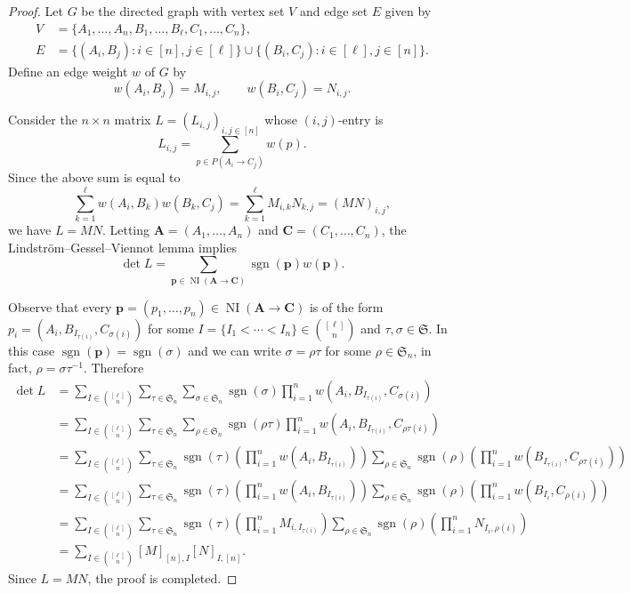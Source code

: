 \documentclass[oneside]{book}
\numberwithin{equation}{section}
\theoremstyle{definition}
\newcommand\NI{\operatorname{NI}}
\newcommand\sgn{\operatorname{sgn}}
\newcommand\sym{\mathfrak{S}}
\renewcommand\vec[1]{\mathbf{#1}}
\begin{document}
\begin{proof}
Let \( G \) be the directed graph with vertex set \( V \)
and edge set \( E \) given by
\begin{align*}
  V &= \{A_1,\dots,A_n, B_1,\dots,B_\ell, C_1,\dots,C_n\}, \\
  E &= \{(A_i,B_j): i\in [n], j\in [\ell]\} \cup
      \{(B_i,C_j): i\in [\ell], j\in [n]\}.
\end{align*}
Define an edge weight \( w \) of \( G \) by
\[
  w(A_i,B_j) = M_{i,j}, \qquad w(B_i,C_j) = N_{i,j}.
\]

Consider the \( n\times n \) matrix \( L=(L_{i,j})_{i,j\in[n]} \)
whose \( (i,j) \)-entry is
\[
  L_{i,j} = \sum_{p\in P(A_i\to C_j)} w(p).
\]
Since the above sum is equal to
\[
    \sum_{k=1}^{\ell} w(A_i,B_k) w(B_k,C_j)
  = \sum_{k=1}^{\ell} M_{i,k} N_{k,j} = (MN)_{i,j},
\]
we have \( L = MN \). Letting \( \vec A = (A_1,\dots,A_n) \) and
\( \vec C = (C_1,\dots,C_n) \), the Lindstr\"om--Gessel--Viennot lemma
implies
\[
  \det L = \sum_{\vec p\in \NI(\vec A \to \vec C)} 
  \sgn(\vec p) w(\vec p).
\]

Observe that every
\( \vec p = (p_1,\dots,p_{n})\in \NI(\vec A \to \vec C) \) is of the
form \( p_i = (A_i, B_{I_{\tau(i)}}, C_{\sigma(i)}) \) for some
\( I = \{I_1 < \cdots <I_n\}\in \binom{[\ell]}{n} \) and
\( \tau,\sigma\in \sym \). In this case
\( \sgn(\vec p) = \sgn(\sigma) \) and we can write
\( \sigma=\rho\tau \) for some \( \rho\in \sym_n \), in fact,
\( \rho = \sigma\tau^{-1} \).
Therefore
\begin{align*}
  \det L
  &= \sum_{I\in \binom{[\ell]}{n}} \sum_{\tau\in\sym_n} \sum_{\sigma\in\sym_n}  \sgn(\sigma) \prod_{i=1}^{n} w(A_i,B_{I_{\tau(i)}}, C_{\sigma(i)})\\
  &= \sum_{I\in \binom{[\ell]}{n}} \sum_{\tau\in\sym_n} \sum_{\rho\in\sym_n}  \sgn(\rho\tau) \prod_{i=1}^{n} w(A_i,B_{I_{\tau(i)}}, C_{\rho\tau(i)})\\
  &= \sum_{I\in \binom{[\ell]}{n}} \sum_{\tau\in\sym_n} \sgn(\tau) \left( \prod_{i=1}^{n} w(A_i,B_{I_{\tau(i)}}) \right)
    \sum_{\rho\in\sym_n}  \sgn(\rho) \left( \prod_{i=1}^{n} w(B_{I_{\tau(i)}}, C_{\rho\tau(i)}) \right)\\
  &= \sum_{I\in \binom{[\ell]}{n}} \sum_{\tau\in\sym_n} \sgn(\tau) \left( \prod_{i=1}^{n} w(A_i,B_{I_{\tau(i)}}) \right)
    \sum_{\rho\in\sym_n}  \sgn(\rho) \left( \prod_{i=1}^{n} w(B_{I_i}, C_{\rho(i)}) \right)\\
  &= \sum_{I\in \binom{[\ell]}{n}} \sum_{\tau\in\sym_n} \sgn(\tau) \left( \prod_{i=1}^{n} M_{i,I_{\tau(i)}} \right)
    \sum_{\rho\in\sym_n}  \sgn(\rho) \left( \prod_{i=1}^{n} N_{I_i,\rho(i)} \right)\\
  &= \sum_{I\in \binom{[\ell]}{n}} [M]_{[n],I} [N]_{I,[n]}.
\end{align*}
Since \( L=MN \), the proof is completed.
\end{proof}
\end{document}
